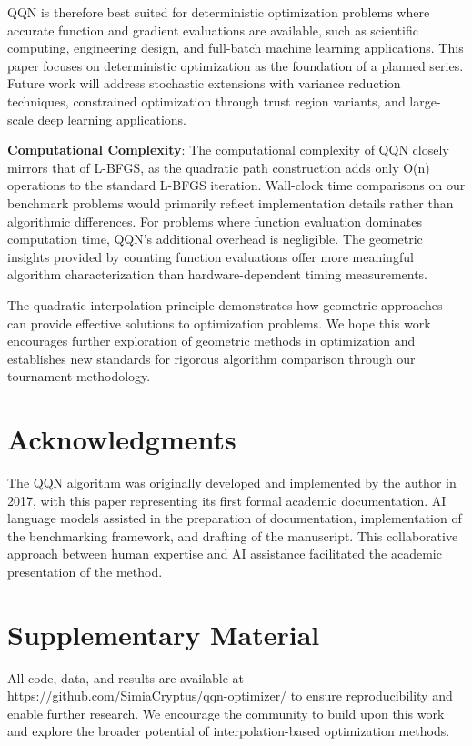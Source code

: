 QQN is therefore best suited for deterministic optimization problems where accurate function and gradient evaluations are available, such as scientific computing, engineering design, and full-batch machine learning applications. This paper focuses on deterministic optimization as the foundation of a planned series. Future work will address stochastic extensions with variance reduction techniques, constrained optimization through trust region variants, and large-scale deep learning applications.

\textbf{Computational Complexity}: The computational complexity of QQN closely mirrors that of L-BFGS, as the quadratic path construction adds only O(n) operations to the standard L-BFGS iteration.
Wall-clock time comparisons on our benchmark problems would primarily reflect implementation details rather than algorithmic differences.
For problems where function evaluation dominates computation time, QQN's additional overhead is negligible.
The geometric insights provided by counting function evaluations offer more meaningful algorithm characterization than hardware-dependent timing measurements.

The quadratic interpolation principle demonstrates how geometric approaches can provide effective solutions to optimization problems.
We hope this work encourages further exploration of geometric methods in optimization and establishes new standards for rigorous algorithm comparison through our tournament methodology.

\hypertarget{acknowledgments}{%
\section{Acknowledgments}\label{acknowledgments}}

The QQN algorithm was originally developed and implemented by the author in 2017, with this paper representing its first formal academic documentation.
AI language models assisted in the preparation of documentation, implementation of the benchmarking framework, and drafting of the manuscript.
This collaborative approach between human expertise and AI assistance facilitated the academic presentation of the method.

\hypertarget{supplementary-material}{%
\section{Supplementary Material}\label{supplementary-material}}

All code, data, and results are available at https://github.com/SimiaCryptus/qqn-optimizer/ to ensure reproducibility and enable further research.
We encourage the community to build upon this work and explore the broader potential of interpolation-based optimization methods.

